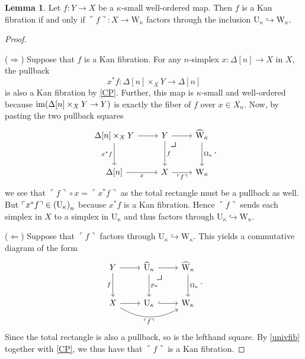 \documentclass[10pt,letterpaper,cm]{nupset}
\theoremstyle{definition}
\theoremstyle{theorem}
\newtheorem{lemma}[definition]{Lemma}
\theoremstyle{remark}
\DeclareMathOperator{\im}{im}
\newcommand{\0}{\mathbf{0}}
\newcommand{\1}{\mathbf{1}}
\newcommand{\2}{\mathbf{2}}
\begin{document}
\begin{lemma}\label{fibfactors}
Let $f: Y \to X$ be a $\kappa$-small well-ordered map. Then $f$ is a Kan fibration if and only if $\ulcorner{f}\urcorner : X \to  \mathrm{W}_{\kappa}$ factors through the inclusion $\mathrm{U}_{\kappa} \hookrightarrow \mathrm{W}_{\kappa}$. 
\end{lemma}
\begin{proof} $ $
\smallskip

($\Longrightarrow$)  Suppose that $f$ is a Kan fibration.  For any $n$-simplex $x : \Delta[n] \to X$ in $X$, the pullback $$x^{\ast}{f} : \Delta[n] \times_X Y \to \Delta[n]$$ is also a Kan fibration by \cref{CP}. Further, this map is $\kappa$-small and well-ordered because  $\im\mleft(\Delta[n] \times_X Y \to Y\mright)$ is exactly the fiber of $f$ over $x \in X_n$.  Now, by pasting the two pullback squares
\[
\begin{tikzcd}[row sep=large]
{\Delta[n]\times_XY} \arrow[d, "x^{\ast}{f}"'] \arrow[r] & Y \arrow[d, "f"] \arrow[r]    \arrow[dr, phantom, "\scalebox{1.5}{\color{black}$\lrcorner$}" , very near start, color=black]            & \widehat{\mathrm{W}}_{\kappa} \arrow[d, "\Omega_{\kappa}"] \\
{\Delta[n]} \arrow[r, "x"']                              & X \arrow[r, "\ulcorner{f}\urcorner"'] & \mathrm{W}_{\kappa}                                       
\end{tikzcd}, 
\] we see that $ \ulcorner{f}\urcorner \circ x = \ulcorner{x^{\ast}{f}}\urcorner$ as the total rectangle must be a pullback as well. But $ \ulcorner{x^{\ast}{f}}\urcorner \in \mleft(\mathrm{U}_{\kappa}\mright)_n$ because $x^{\ast}{f}$ is a Kan fibration. Hence  $ \ulcorner{f}\urcorner$ sends each simplex in $X$ to a simplex  in $\mathrm{U}_{\kappa}$ and thus factors through $\mathrm{U}_{\kappa} \hookrightarrow \mathrm{W}_{\kappa}$.

\medskip

($\Longleftarrow$) Suppose that $\ulcorner{f}\urcorner$ factors through $\mathrm{U}_{\kappa} \hookrightarrow \mathrm{W}_{\kappa}$. This yields a commutative diagram of the form
\[
\begin{tikzcd}[row sep=large]
Y \arrow[d, "f"'] \arrow[r]                                  & \widehat{\mathrm{U}}_{\kappa} \arrow[d, "p_{\kappa}"] \arrow[r] 
 \arrow[dr, phantom, "\scalebox{1.5}{\color{black}$\lrcorner$}" , very near start, color=black]  
  & \widehat{\mathrm{W}}_{\kappa} \arrow[d, "\Omega_{\kappa}"] \\
X \arrow[r] \arrow[rr, "\ulcorner{f}\urcorner"', bend right] & \mathrm{U}_{\kappa} \arrow[r, hook]                             & \mathrm{W}_{\kappa}                                       
\end{tikzcd}
.\] Since the total rectangle is also a pullback, so is the lefthand square. By \cref{univfib} together with \cref{CP}, we thus have that $\ulcorner{f}\urcorner$ is a Kan fibration. 
\end{proof}
\end{document}
